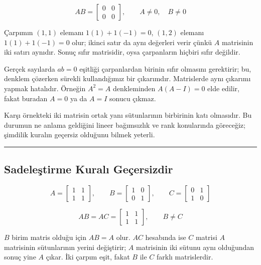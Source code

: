 \documentclass[
  letterpaper,
  DIV=11,
  numbers=noendperiod]{scrartcl}
\begin{document}
\[
AB=\begin{bmatrix}0&0\\0&0\end{bmatrix},
\qquad
A\ne0,\quad B\ne0
\]

Çarpımın \((1,1)\) elemanı \(1(1)+1(-1)=0\), \((1,2)\) elemanı
\(1(1)+1(-1)=0\) olur; ikinci satır da aynı değerleri verir çünkü \(A\)
matrisinin iki satırı aynıdır. Sonuç sıfır matrisidir, oysa çarpanların
hiçbiri sıfır değildir.

Gerçek sayılarda \(ab=0\) eşitliği çarpanlardan birinin sıfır olmasını
gerektirir; bu, denklem çözerken sürekli kullandığımız bir çıkarımdır.
Matrislerde aynı çıkarımı yapmak hatalıdır. Örneğin \(A^2=A\)
denkleminden \(A(A-I)=0\) elde edilir, fakat buradan \(A=0\) ya da
\(A=I\) sonucu çıkmaz.

Karşı örnekteki iki matrisin ortak yanı sütunlarının birbirinin katı
olmasıdır. Bu durumun ne anlama geldiğini lineer bağımsızlık ve rank
konularında göreceğiz; şimdilik kuralın geçersiz olduğunu bilmek
yeterli.

\begin{center}\rule{0.5\linewidth}{0.5pt}\end{center}

\subsection{Sadeleştirme Kuralı
Geçersizdir}\label{sadeleux15ftirme-kuralux131-geuxe7ersizdir}

\[
A=\begin{bmatrix}1&1\\1&1\end{bmatrix},
\qquad
B=\begin{bmatrix}1&0\\0&1\end{bmatrix},
\qquad
C=\begin{bmatrix}0&1\\1&0\end{bmatrix}
\]

\[
AB=AC=\begin{bmatrix}1&1\\1&1\end{bmatrix},
\qquad
B\ne C
\]

\(B\) birim matris olduğu için \(AB=A\) olur. \(AC\) hesabında ise \(C\)
matrisi \(A\) matrisinin sütunlarının yerini değiştirir; \(A\)
matrisinin iki sütunu aynı olduğundan sonuç yine \(A\) çıkar. İki çarpım
eşit, fakat \(B\) ile \(C\) farklı matrislerdir.
\end{document}
